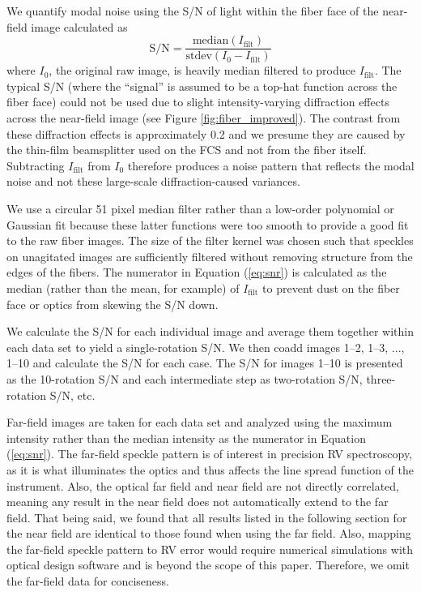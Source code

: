 We quantify modal noise using the S/N of light within the fiber face of the near-field image calculated as
\begin{equation}
\mathrm{S/N} = \frac{\mathrm{median}(I_\mathrm{filt})}{\mathrm{stdev}(I_0 - I_\mathrm{filt})}
\label{eq:snr}
\end{equation}
where $I_0$, the original raw image, is heavily median filtered to produce $I_\mathrm{filt}$. The typical S/N (where the ``signal'' is assumed to be a top-hat function across the fiber face) could not be used due to slight intensity-varying diffraction effects across the near-field image (see Figure \ref{fig:fiber_improved}). The contrast from these diffraction effects is approximately 0.2 and we presume they are caused by the thin-film beamsplitter used on the FCS and not from the fiber itself. Subtracting $I_\mathrm{filt}$ from $I_0$ therefore produces a noise pattern that reflects the modal noise and not these large-scale diffraction-caused variances.

We use a circular 51 pixel median filter rather than a low-order polynomial or Gaussian fit because these latter functions were too smooth to provide a good fit to the raw fiber images. The size of the filter kernel was chosen such that speckles on unagitated images are sufficiently filtered without removing structure from the edges of the fibers. The numerator in Equation (\ref{eq:snr}) is calculated as the median (rather than the mean, for example) of $I_\mathrm{filt}$ to prevent dust on the fiber face or optics from skewing the S/N down.

We calculate the S/N for each individual image and average them together within each data set to yield a single-rotation S/N. We then coadd images 1--2, 1--3, ..., 1--10 and calculate the S/N for each case. The S/N for images 1--10 is presented as the 10-rotation S/N and each intermediate step as two-rotation S/N, three-rotation S/N, etc.

Far-field images are taken for each data set and analyzed using the maximum intensity rather than the median intensity as the numerator in Equation (\ref{eq:snr}). The far-field speckle pattern is of interest in precision RV spectroscopy, as it is what illuminates the optics and thus affects the line spread function of the instrument. Also, the optical far field and near field are not directly correlated, meaning any result in the near field does not automatically extend to the far field. That being said, we found that all results listed in the following section for the near field are identical to those found when using the far field. Also, mapping the far-field speckle pattern to RV error would require numerical simulations with optical design software and is beyond the scope of this paper. Therefore, we omit the far-field data for conciseness.

